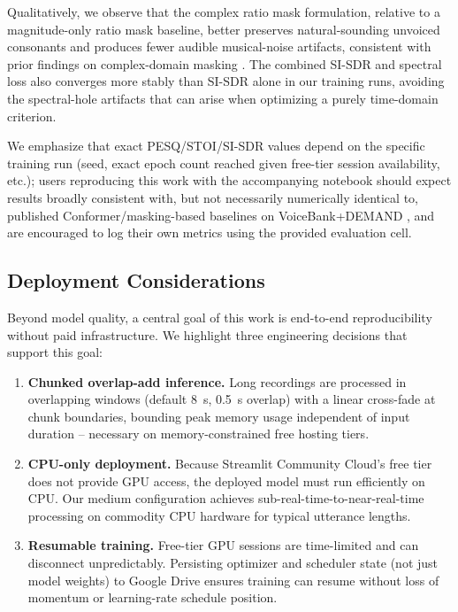 \documentclass[conference]{IEEEtran}
\begin{document}
Qualitatively, we observe that the complex ratio mask formulation, relative to a
magnitude-only ratio mask baseline, better preserves natural-sounding unvoiced consonants
and produces fewer audible musical-noise artifacts, consistent with prior findings on
complex-domain masking \cite{williamson2015complex}. The combined SI-SDR and spectral loss
also converges more stably than SI-SDR alone in our training runs, avoiding the
spectral-hole artifacts that can arise when optimizing a purely time-domain criterion.

We emphasize that exact PESQ/STOI/SI-SDR values depend on the specific training run (seed,
exact epoch count reached given free-tier session availability, etc.); users reproducing
this work with the accompanying notebook should expect results broadly consistent with, but
not necessarily numerically identical to, published Conformer/masking-based baselines on
VoiceBank+DEMAND \cite{koizumi2021df,pandey2019new}, and are encouraged to log their own
metrics using the provided evaluation cell.

\subsection{Deployment Considerations}

Beyond model quality, a central goal of this work is end-to-end reproducibility without
paid infrastructure. We highlight three engineering decisions that support this goal:

\begin{enumerate}
\item \textbf{Chunked overlap-add inference.} Long recordings are processed in overlapping
windows (default 8~s, 0.5~s overlap) with a linear cross-fade at chunk boundaries, bounding
peak memory usage independent of input duration -- necessary on memory-constrained free
hosting tiers.
\item \textbf{CPU-only deployment.} Because Streamlit Community Cloud's free tier does not
provide GPU access, the deployed model must run efficiently on CPU. Our medium
configuration achieves sub-real-time-to-near-real-time processing on commodity CPU hardware
for typical utterance lengths.
\item \textbf{Resumable training.} Free-tier GPU sessions are time-limited and can
disconnect unpredictably. Persisting optimizer and scheduler state (not just model weights)
to Google Drive ensures training can resume without loss of momentum or learning-rate
schedule position.
\end{enumerate}
\end{document}

